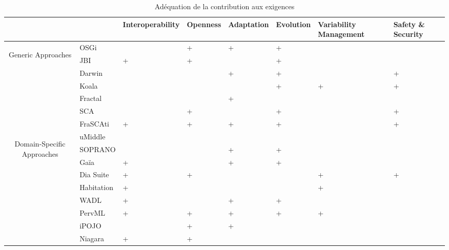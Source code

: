 
\begin{table}[h!]
\begin{tabular}{cm{}|| >{\centering\arraybackslash}m{}| >{\centering\arraybackslash}m{}| >{\centering\arraybackslash}m{}| >{\centering\arraybackslash}m{}| >{\centering}m{}| >{\centering\arraybackslash}m{}|}
 & & {\tiny Interoperability} & {\tiny Openness} & {\tiny Adaptation} & {\tiny Evolution} & {\tiny Variability Management} & {\tiny Safety \& Security}\\
 \hline\hline
 \multirow{7}{8mm}{\begin{sideways}\parbox{25mm}{\centering Generic Approaches}\end{sideways}}
 &{\small OSGi} 		&  & + & + & + &  &  \\ 
 &{\small JBI} 			& + & + &  & + &  &  \\
 \cline{2-8}%
 &{\small Darwin} 		&  &  & + & + &   & + \\ 
 &{\small Koala} 		&  &  &   & + & + & + \\
 &{\small Fractal} 		&  &  & + &   &   &  \\
 \cline{2-8}%
 &{\small SCA} 			&   & + &  & + &  & +\\
 &{\small FraSCAti}     & + & + & + & + &  & + \\
 \hline\hline
 \multirow{9}{8mm}{\begin{sideways}\parbox{30mm}{\centering  Domain-Specific Approaches}\end{sideways}} 
 &{\small uMiddle} 		&  &  &  &  &  &  \\
 &{\small SOPRANO} 		&  &  & + & + &  &  \\
 &{\small Ga\"ia} 		& + &  & + & + &  &  \\
 &{\small Dia Suite} 	& + & + &  &  & + & + \\
 &{\small Habitation} 	& + &  &  &  & + &  \\
 &{\small WADL} 		& + &  & + & + &  &  \\
 &{\small PervML} 		& + & + & + & + & + &  \\
 &{\small iPOJO} 		&  & + & + &  &  &  \\
 &{\small Niagara} 		& + & + &  &  &  &  \\
 \hline
\end{tabular}
\caption{Adéquation de la contribution aux exigences}
\label{tab:adequatnessFr}
\end{table}


